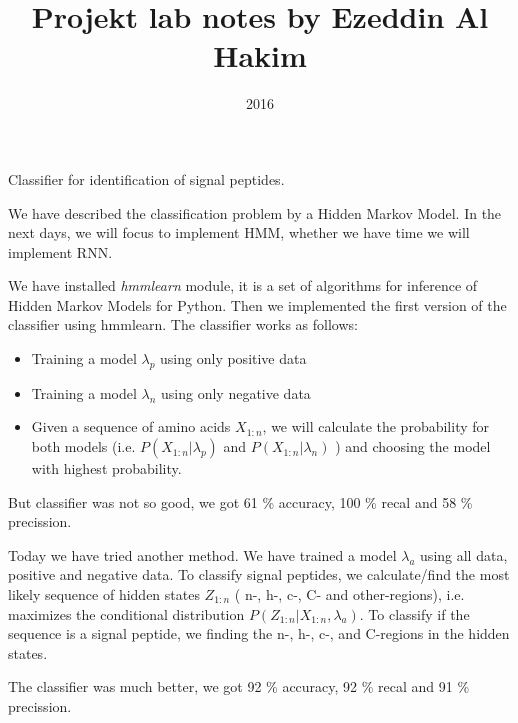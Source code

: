 \documentclass[a4paper]{tufte-handout}
\title{Projekt lab notes by Ezeddin Al Hakim}
\date{2016}
\begin{document}
\maketitle


\begin{projects}
	\begin{description}
		\item Classifier for identification of signal peptides.
    \end{description}
\end{projects}


We have described the classification problem by a Hidden Markov Model. In the next days, we will focus to implement HMM, whether we have time we will implement RNN.

We have installed \textit{hmmlearn} module, it is a set of algorithms for inference of Hidden Markov Models for Python. Then we implemented the first version of the classifier using hmmlearn. The classifier works as follows:
\begin{itemize}
\item Training a model $\lambda_p$ using only positive data 
\item Training a model $\lambda_n$ using only negative data 
\item   Given a sequence of amino acids $X_{1:n}$, we will calculate the probability for both models (i.e. $P(X_{1:n}|\lambda_p)$ and $P(X_{1:n}|\lambda_n)$ ) and choosing the model with highest probability.
\end{itemize}

But classifier was not so good, we got 61 \% accuracy,  100 \% recal and 58 \% precission. 

Today we have tried another method. We have trained a model $\lambda_a$  using all data, positive and negative data. To classify signal peptides, we calculate/find the most likely sequence of hidden states $Z_{1:n}$ ( n-, h-, c-, C- and other-regions), i.e. maximizes the conditional distribution  $P(Z_{1:n}|X_{1:n},\lambda_a)$. To classify if the sequence is a signal peptide, we finding the n-, h-, c-, and C-regions in the hidden states.

The classifier was much better, we got 92 \% accuracy,  92 \% recal and 91 \% precission. 
\end{document}
